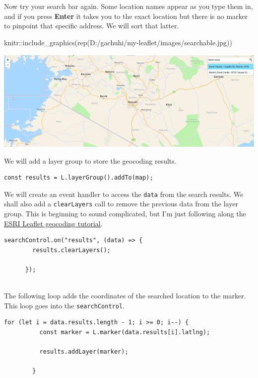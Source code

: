 \documentclass[
]{book}
\newenvironment{Shaded}{\begin{snugshade}}{\end{snugshade}}
\newcommand{\FunctionTok}[1]{\textcolor[rgb]{0.00,0.00,0.00}{#1}}
\newcommand{\NormalTok}[1]{#1}
\newcommand{\SpecialCharTok}[1]{\textcolor[rgb]{0.00,0.00,0.00}{#1}}
\newcommand{\StringTok}[1]{\textcolor[rgb]{0.31,0.60,0.02}{#1}}
\begin{document}
Now try your search bar again. Some location names appear as you type them in, and if you press \textbf{Enter} it takes you to the exact location but there is no marker to pinpoint that specific address. We will sort that latter.

\begin{Shaded}
\begin{Highlighting}[]
\NormalTok{knitr}\SpecialCharTok{::}\FunctionTok{include\_graphics}\NormalTok{(}\FunctionTok{rep}\NormalTok{(}\StringTok{\textquotesingle{}D:/gachuhi/my{-}leaflet/images/searchable.jpg\textquotesingle{}}\NormalTok{))}
\end{Highlighting}
\end{Shaded}

\includegraphics[width=25.9in]{../images/searchable}

We will add a layer group to store the geocoding results.

\begin{verbatim}
const results = L.layerGroup().addTo(map);
\end{verbatim}

We will create an event handler to access the \texttt{data} from the search results. We shall also add a \texttt{clearLayers} call to remove the previous data from the layer group. This is beginning to sound complicated, but I'm just following along the \href{https://developers.arcgis.com/esri-leaflet/geocode-and-search/search-for-an-address/?utm_source=pocket_saves}{ESRI Leaflet geocoding tutorial}.

\begin{verbatim}
searchControl.on("results", (data) => {
        results.clearLayers();

      });
      
\end{verbatim}

The following loop adds the coordinates of the searched location to the marker. This loop goes into the \texttt{searchControl}.

\begin{verbatim}
for (let i = data.results.length - 1; i >= 0; i--) {
          const marker = L.marker(data.results[i].latlng);

          results.addLayer(marker);

        }
\end{verbatim}
\end{document}
